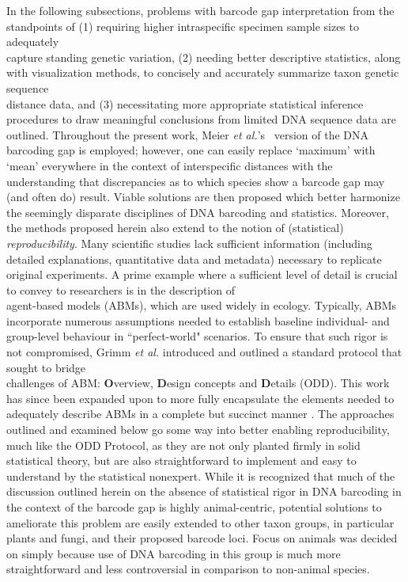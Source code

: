 In the following subsections, problems with barcode gap interpretation from the \\ standpoints of (1) requiring higher intraspecific specimen sample sizes to adequately \\ capture standing genetic variation, (2) needing better descriptive statistics, along with visualization methods, to concisely and accurately summarize taxon genetic sequence \\ distance data, and (3) necessitating more appropriate statistical inference procedures to draw meaningful conclusions from limited DNA sequence data are outlined. Throughout the present work, Meier \textit{et al.}'s~\cite{meier2008use} version of the DNA barcoding gap is employed; however, one can easily replace `maximum' with `mean' everywhere in the context of interspecific distances with the understanding that discrepancies as to which species show a barcode gap may (and often do) result. Viable solutions are then proposed which better harmonize the seemingly disparate disciplines of DNA barcoding and statistics. Moreover, the methods proposed herein also extend to the notion of (statistical) \textit{reproducibility}. Many scientific studies lack sufficient information (including detailed explanations, quantitative data and metadata) necessary to replicate original experiments. A prime example where a sufficient level of detail is crucial to convey to researchers is in the description of \\ agent-based models (ABMs), which are used widely in ecology. Typically, ABMs \\ incorporate numerous assumptions needed to establish baseline individual- and group-level behaviour in ``perfect-world" scenarios. To ensure that such rigor is not compromised, Grimm \textit{et al.} \cite{grimm2006standard} introduced and outlined a standard protocol that sought to bridge \\ challenges of ABM: \textbf{O}verview, \textbf{D}esign concepts and \textbf{D}etails (ODD). This work has since been expanded upon to more fully encapsulate the elements needed to adequately describe ABMs in a complete but succinct manner \cite{grimm2010odd}. The approaches outlined and examined below go some way into better enabling reproducibility, much like the ODD Protocol, as they are not only planted firmly in solid statistical theory, but are also straightforward to implement and easy to understand by the statistical nonexpert. While it is recognized that much of the discussion outlined herein on the absence of statistical rigor in DNA barcoding in the context of the barcode gap is highly animal-centric, potential solutions to ameliorate this problem are easily extended to other taxon groups, in particular plants and fungi, and their proposed barcode loci. Focus on animals was decided on simply because use of DNA barcoding in this group is much more straightforward and less controversial in comparison to non-animal species.



